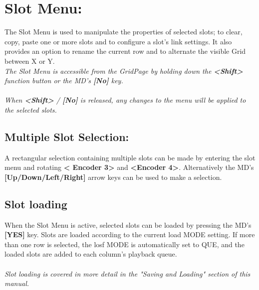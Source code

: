 \chapter{Slot Menu:}

The Slot Menu is used to manipulate the properties of selected slots; to clear, copy, paste one or more slots and to configure a slot's link settings. It also provides an option to rename the current row and to alternate the visible Grid between X or Y.
\\
\textit{The Slot Menu is accessible from the GridPage by holding down the \textbf{<Shift>} function button or the MD's \textbf{[No]} key.\\\\When \textbf{<Shift>} / \textbf{[No]} is released, any changes to the menu will be applied to the selected slots. }
\section{Multiple Slot Selection:}
A rectangular selection containing multiple slots can be made by entering the slot menu and rotating \textbf{< Encoder 3>} and \textbf{<Encoder 4>}. Alternatively the MD's \textbf{[Up/Down/Left/Right]} arrow keys can be used to make a selection.
\section{Slot loading}
When the Slot Menu is active, selected slots can be loaded by pressing the MD's \textbf{[YES]} key. 
Slots are loaded according to the current load MODE setting. If more than one row is selected, the losf MODE is automatically set to QUE, and the loaded slots are added to each column's playback queue.
\\\\
\textit{Slot loading is covered in more detail in the "Saving and Loading" section of this manual.}
\newpage
